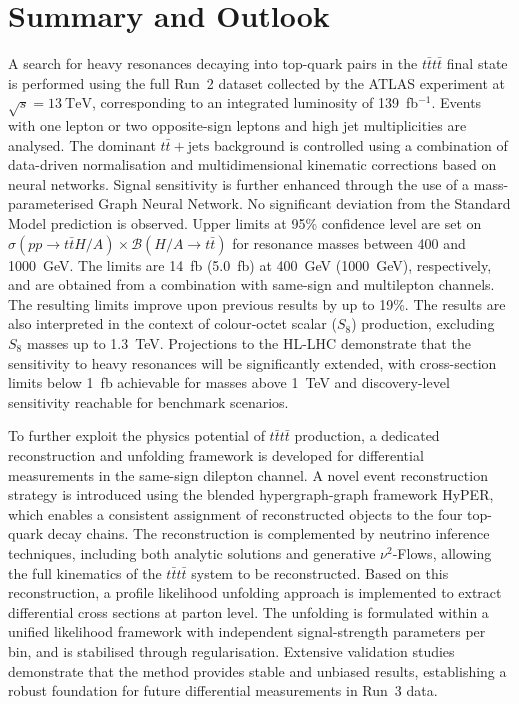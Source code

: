 ﻿%

\chapter{Summary and Outlook}

A search for heavy resonances decaying into top-quark pairs in the $t\bar{t}t\bar{t}$ final state is performed 
using the full Run~2 dataset collected by the ATLAS experiment at $\sqrt{s}=13~\mathrm{TeV}$, 
corresponding to an integrated luminosity of 139~fb$^{-1}$. 
Events with one lepton or two opposite-sign leptons and high jet multiplicities are analysed. 
The dominant $t\bar{t}+\text{jets}$ background is controlled using a combination of 
data-driven normalisation and multidimensional kinematic corrections based on neural networks. 
Signal sensitivity is further enhanced through the use of a mass-parameterised Graph Neural Network.
No significant deviation from the Standard Model prediction is observed. 
Upper limits at 95\% confidence level are set on 
$\sigma(pp \to t\bar{t}H/A)\times \mathcal{B}(H/A \to t\bar{t})$ 
for resonance masses between 400 and 1000~GeV. 
The limits are 14~fb (5.0~fb) at 400~GeV (1000~GeV), respectively, 
and are obtained from a combination with same-sign and multilepton channels.
The resulting limits improve upon previous results by up to 19\%. 
The results are also interpreted in the context of colour-octet scalar ($S_8$) production, 
excluding $S_8$ masses up to 1.3~TeV. 
Projections to the HL-LHC demonstrate that the sensitivity to heavy resonances 
will be significantly extended, with cross-section limits below 1~fb achievable 
for masses above 1~TeV and discovery-level sensitivity reachable for benchmark scenarios.

To further exploit the physics potential of $t\bar{t}t\bar{t}$ production, 
a dedicated reconstruction and unfolding framework is developed for differential measurements 
in the same-sign dilepton channel. 
A novel event reconstruction strategy is introduced using the blended hypergraph-graph framework HyPER, 
which enables a consistent assignment of reconstructed objects to the four top-quark decay chains. 
The reconstruction is complemented by neutrino inference techniques, 
including both analytic solutions and generative $\nu^2$-Flows, 
allowing the full kinematics of the $t\bar{t}t\bar{t}$ system to be reconstructed.
Based on this reconstruction, a profile likelihood unfolding approach is implemented 
to extract differential cross sections at parton level. 
The unfolding is formulated within a unified likelihood framework with independent signal-strength parameters per bin, 
and is stabilised through regularisation. 
Extensive validation studies demonstrate that the method provides stable and unbiased results, 
establishing a robust foundation for future differential measurements in Run~3 data.

